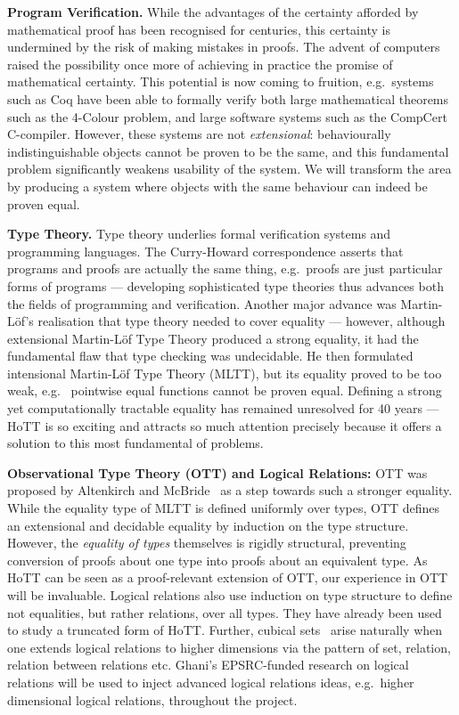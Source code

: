 \documentclass[a4paper,11pt]{article}
\newcommand{\eg}{{e.g.}\ }
\begin{document}

{\bf Program Verification.} While the advantages of the certainty
afforded by mathematical proof has been recognised for centuries, this
certainty is undermined by the risk of making mistakes in
proofs. The advent of computers raised the possibility once more of
achieving in practice the promise of mathematical certainty. This
potential is now coming to fruition, \eg systems such as Coq have been
able to formally verify both large mathematical theorems such as the
4-Colour problem, and large software systems such as the CompCert
C-compiler. However, these systems are not {\em extensional}:
behaviourally indistinguishable objects cannot be proven to be the
same, and this fundamental problem significantly weakens usability of the
system. We will transform the area by producing a system where
objects with the same behaviour can indeed be proven equal.


{\bf Type Theory.} Type theory underlies formal verification systems and
programming languages. The
Curry-Howard correspondence asserts that programs and proofs are
actually the same thing, \eg proofs are just particular forms of
programs --- developing sophisticated type theories thus advances both 
the fields of programming and verification. Another
major advance was Martin-L\"of's realisation that type theory needed
to cover equality --- however, although 
extensional Martin-L\"of Type Theory produced
a strong equality, it had the fundamental flaw that type
checking was undecidable. He then formulated intensional Martin-L\"of
Type Theory (MLTT), but its equality proved to be too weak, \eg
pointwise equal functions cannot be proven equal. Defining a strong yet
computationally tractable equality has remained unresolved for 40
years --- HoTT is so exciting and attracts so much attention precisely because it offers a
solution to this most fundamental of problems.

{\bf Observational Type Theory (OTT) and Logical Relations:} OTT was
proposed by Altenkirch and McBride~\cite{alti:ott-conf} as a step
towards such a stronger equality. While the equality type of MLTT is
defined uniformly over types, OTT defines an extensional and decidable
equality by induction on the type structure. However, the {\em
  equality of types} themselves is rigidly structural, preventing
conversion of proofs about one type into proofs about an equivalent
type. As HoTT can be seen as a proof-relevant extension of OTT, our
experience in OTT will be invaluable. Logical relations also use
induction on type structure to define not equalities, but rather
relations, over all types. They have already been
used~\cite{licataHarper:canonicity2d} to study a truncated form of
HoTT. Further, cubical sets~\cite{BezemM:cubsmt} arise naturally when
one extends logical relations to higher dimensions via the pattern of
set, relation, relation between relations etc. Ghani's EPSRC-funded
research on logical relations will be used to inject advanced logical
relations ideas, \eg higher dimensional logical relations, throughout
the project.
\end{document}

